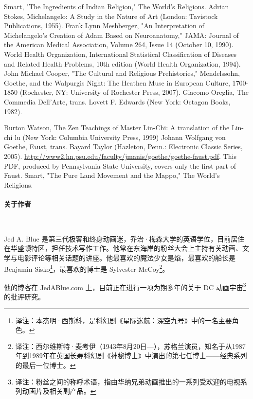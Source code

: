 \begin{thebibliography}{200}
    Smart, "The Ingredients of Indian Religion," The World's Religions.
    Adrian Stokes, Michelangelo: A Study in the Nature of Art (London: Tavistock Publications, 1955).
    Frank Lynn Meshberger, "An Interpretation of Michelangelo's Creation of Adam Based on Neuroanatomy," JAMA: Journal of the American Medical Association, Volume 264, Issue 14 (October 10, 1990).
    World Health Organization, International Statistical Classification of Diseases and Related Health Problems, 10th edition (World Health Organization, 1994).
    John Michael Cooper, "The Cultural and Religious Prehistories," Mendelssohn, Goethe, and the Walpurgis Night: The Heathen Muse in European Culture, 1700-1850 (Rochester, NY: University of Rochester Press, 2007).
    Giacomo Oreglia, The Commedia Dell'Arte, trans. Lovett F. Edwards (New York: Octagon Books, 1982).
    

    Burton Watson, The Zen Teachings of Master Lin-Chi: A translation of the Lin-chi lu (New York: Columbia University Press, 1999)
    Johann Wolfgang von Goethe, Faust, trans. Bayard Taylor (Hazleton, Penn.: Electronic Classic Series, 2005). \url{http://www2.hn.psu.edu/faculty/jmanis/goethe/goethe-faust.pdf}. This PDF, produced by Pennsylvania State University, covers only the first part of Faust.
    Smart, "The Pure Land Movement and the Mappo," The World's Religions.

    
\end{thebibliography}

\newpage
\paragraph{关于作者}~{}

Jed A. Blue 是第三代极客和终身动画迷，乔治·梅森大学的英语学位，目前居住在华盛顿特区，担任技术写作工作。他常在东海岸的粉丝大会上主持有关动画、文学与电影评论等相关话题的讲座。他最喜欢的魔法少女是焰，最喜欢的船长是 Benjamin Sisko\footnote{译注：本杰明·西斯科，是科幻剧《星际迷航：深空九号》中的一名主要角色。}，最喜欢的博士是 Sylvester McCoy\footnote{译注：西尔维斯特·麦考伊（1943年8月20日—），苏格兰演员，知名于从1987年到1989年在英国长寿科幻剧《神秘博士》中演出的第七任博士——经典系列的最后一位博士。}。

他的博客在 JedABlue.com 上，目前正在进行一项为期多年的关于 DC 动画宇宙\footnote{译注：粉丝之间的称呼术语，指由华纳兄弟动画推出的一系列受欢迎的电视系列动画片及相关副产品。}的批评研究。
